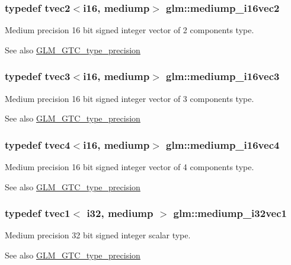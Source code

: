 \subsubsection[{mediump\+\_\+i16vec2}]{\setlength{\rightskip}{0pt plus 5cm}typedef tvec2$<${\bf i16}, mediump$>$ {\bf glm\+::mediump\+\_\+i16vec2}}\label{namespaceglm_a30e41646d450633d867c38d82c113ba0}
Medium precision 16 bit signed integer vector of 2 components type. \begin{DoxySeeAlso}{See also}
\hyperlink{group__gtc__type__precision}{G\+L\+M\+\_\+\+G\+T\+C\+\_\+type\+\_\+precision} 
\end{DoxySeeAlso}
\hypertarget{namespaceglm_ab7fe8fe919b172a99f22b6c86a4cfda6}{}
\subsubsection[{mediump\+\_\+i16vec3}]{\setlength{\rightskip}{0pt plus 5cm}typedef tvec3$<${\bf i16}, mediump$>$ {\bf glm\+::mediump\+\_\+i16vec3}}\label{namespaceglm_ab7fe8fe919b172a99f22b6c86a4cfda6}
Medium precision 16 bit signed integer vector of 3 components type. \begin{DoxySeeAlso}{See also}
\hyperlink{group__gtc__type__precision}{G\+L\+M\+\_\+\+G\+T\+C\+\_\+type\+\_\+precision} 
\end{DoxySeeAlso}
\hypertarget{namespaceglm_a36db2c2e6dcc57ca23b992e3ff9937ad}{}
\subsubsection[{mediump\+\_\+i16vec4}]{\setlength{\rightskip}{0pt plus 5cm}typedef tvec4$<${\bf i16}, mediump$>$ {\bf glm\+::mediump\+\_\+i16vec4}}\label{namespaceglm_a36db2c2e6dcc57ca23b992e3ff9937ad}
Medium precision 16 bit signed integer vector of 4 components type. \begin{DoxySeeAlso}{See also}
\hyperlink{group__gtc__type__precision}{G\+L\+M\+\_\+\+G\+T\+C\+\_\+type\+\_\+precision} 
\end{DoxySeeAlso}
\hypertarget{namespaceglm_aceff016e1d5692bf47b84cd0e3e80289}{}
\subsubsection[{mediump\+\_\+i32vec1}]{\setlength{\rightskip}{0pt plus 5cm}typedef tvec1$<$ {\bf i32}, mediump $>$ {\bf glm\+::mediump\+\_\+i32vec1}}\label{namespaceglm_aceff016e1d5692bf47b84cd0e3e80289}
Medium precision 32 bit signed integer scalar type. \begin{DoxySeeAlso}{See also}
\hyperlink{group__gtc__type__precision}{G\+L\+M\+\_\+\+G\+T\+C\+\_\+type\+\_\+precision} 
\end{DoxySeeAlso}
\hypertarget{namespaceglm_a7340c2a0bb4cef81a39af043b5604054}{}
